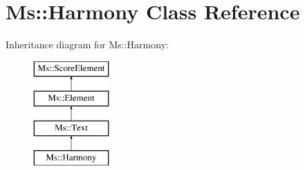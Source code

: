 \hypertarget{class_ms_1_1_harmony}{}\section{Ms\+:\+:Harmony Class Reference}
\label{class_ms_1_1_harmony}
Inheritance diagram for Ms\+:\+:Harmony\+:\begin{figure}[H]
\begin{center}
\leavevmode
\includegraphics[height=4.000000cm]{class_ms_1_1_harmony}
\end{center}
\end{figure}
